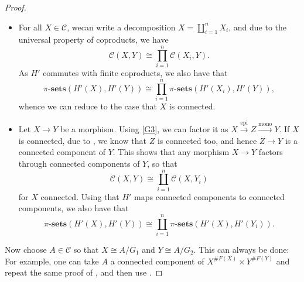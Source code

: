 \documentclass[10pt]{article}
\theoremstyle{thmstyle}
\theoremstyle{defstyle}
\newcommand{\sets}[1]{#1\text{-}\mathbf{sets}}
\newcommand{\scrC}{\mathscr{C}} %
\begin{document}
\begin{proof}
    \begin{itemize}
        \item For all $X\in\scrC$, wecan write a decomposition $X = \coprod_{i = 1}^n X_i$, and due to the universal property of coproducts, we have 
        \begin{equation*}
            \scrC(X, Y)\cong\prod_{i = 1}^n\scrC(X_i, Y).
        \end{equation*}
        As $H'$ commutes with finite coproducts, we also have that 
        \begin{equation*}
            \sets{\pi}(H'(X), H'(Y))\cong\prod_{i = 1}^n\sets{\pi}\left(H'(X_i), H'(Y)\right),
        \end{equation*}
        whence we can reduce to the case that $X$ is connected. 

        \item Let $X\to Y$ be a morphism. Using \ref{G3}, we can factor it as $X\xrightarrow{\mathrm{epi}} Z\xrightarrow{\mathrm{mono}} Y$. If $X$ is connected, due to , we know that $Z$ is connected too, and hence $Z\to Y$ is a connected component of $Y$. This shows that any morphism $X\to Y$ factors through connected components of $Y$, so that 
        \begin{equation*}
            \scrC(X, Y)\cong\coprod_{i = 1}^n\scrC(X, Y_i)
        \end{equation*}
        for $X$ connected. Using that $H'$ maps connected components to connected components, we also have that 
        \begin{equation*}
            \sets{\pi}\left(H'(X), H'(Y)\right)\cong\coprod_{i = 1}^n\sets{\pi}\left(H'(X), H'(Y_i)\right).
        \end{equation*}
    \end{itemize}

    Now choose $A\in\scrC$ so that $X\cong A/G_1$ and $Y\cong A/G_2$. This can always be done: For example, one can take $A$ a connected component of $X^{\# F(X)}\times Y^{\# F(Y)}$ and repeat the same proof of , and then use . 


\end{proof}
\end{document}
